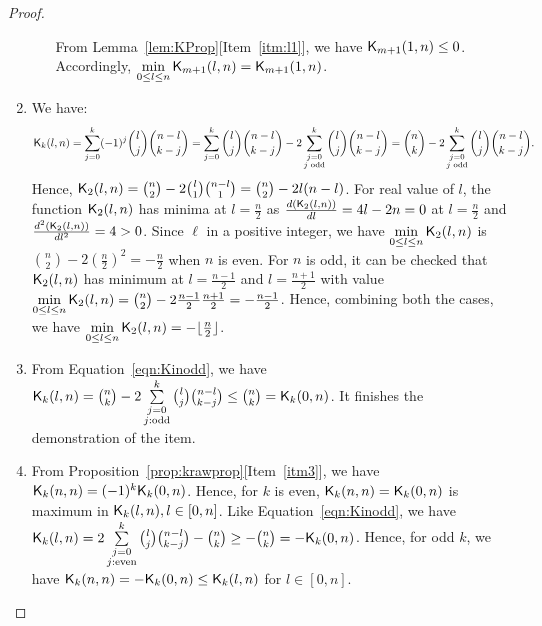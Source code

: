 \documentclass{llncs}
\begin{document}
\begin{proof}
\begin{enumerate}
\begin{enumerate}
From Lemma~\ref{lem:KProp}[Item~\ref{itm:l1}], we have $\mathsf{K}_{m+1}(1,n) \leq 0$. Accordingly, $\min\limits_{0 \leq l \leq n }\mathsf{K}_{m + 1}(l,n) = \mathsf{K}_{m + 1}(1,n)$.
\end{enumerate}
\item We have:
{\small
\begin{equation}\label{eqn:Kinodd}
\mathsf{K}_{k}(l,n) = \sum\limits_{j=0}^k(-1)^j{l \choose j}{n-l \choose k-j}
= \sum\limits_{j=0}^k {l \choose j}{n-l \choose k-j} - 2 \sum\limits_{\substack{j=0 \\ j\text{ odd}}}^k {l \choose j}{n-l \choose k-j}
= {n \choose k} - 2 \sum\limits_{\substack{j=0 \\ j \text{ odd}}}^k {l \choose j}{n-l \choose k-j}.
\end{equation}}
Hence, $\mathsf{K}_{2}(l,n) = {n \choose 2} - 2{l \choose 1}{n-l \choose 1} = {n \choose 2} - 2l(n-l)$. 
For real value of $l$, the function $\mathsf{K}_{2}(l,n)$ has minima at $l = \frac{n}{2}$ as $\frac{d(\mathsf{K}_{2}(l,n))}{dl} = 4l-2n = 0$ at $l = \frac{n}{2}$ and $\frac{d^2(\mathsf{K}_{2}(l,n))}{dl^2} = 4 > 0$. 
Since $\ell$ in a positive integer, we have $\min\limits_{0 \leq l \leq n} \mathsf{K}_{2}(l,n)$ is ${n \choose 2} - 2(\frac{n}{2})^2 = -\frac{n}{2}$ when $n$ is even. 
For $n$ is odd, it can be checked that $\mathsf{K}_{2}(l,n)$ has minimum at $l = \frac{n-1}{2}$ and $l = \frac{n+1}{2}$ with value $\min\limits_{0 \leq l \leq n} \mathsf{K}_{2}(l,n) =
{n \choose 2} - 2\frac{n-1}{2} \frac{n+1}{2}= -\frac{n-1}{2}$. 
Hence, combining both the cases, we have $\min\limits_{0 \leq l \leq n} \mathsf{K}_{2}(l,n) = -\lfloor \frac{n}{2} \rfloor$.
\item From Equation~\ref{eqn:Kinodd}, we have 
$\mathsf{K}_{k}(l,n) = {n \choose k} - 2 \sum\limits_{\substack{j=0 \\ j: \text{odd}}}^k {l \choose j}{n-l \choose k-j} \leq {n \choose k} = \mathsf{K}_{k}(0,n)$.
It finishes the demonstration of the item.
\item From Proposition~\ref{prop:krawprop}[Item~\ref{itm3}], we have $\mathsf{K}_{k}(n,n) = (-1)^k \mathsf{K}_{k}(0,n)$. Hence, for $k$ is even, $\mathsf{K}_{k}(n,n) = \mathsf{K}_{k}(0,n)$ is maximum in $\mathsf{K}_{k}(l,n), l\in [0,n]$.
Like Equation~\ref{eqn:Kinodd}, we have $\mathsf{K}_{k}(l,n) = 2 \sum\limits_{\substack{j=0 \\ j: \text{even}}}^k {l \choose j}{n-l \choose k-j} - {n \choose k} \geq - {n \choose k} = -\mathsf{K}_{k}(0,n)$.
Hence, for odd $k$, we have $\mathsf{K}_{k}(n,n) = -\mathsf{K}_{k}(0,n) \leq \mathsf{K}_{k}(l,n)$ for $l \in [0,n]$.
\end{enumerate}
\end{proof}
\end{document}

